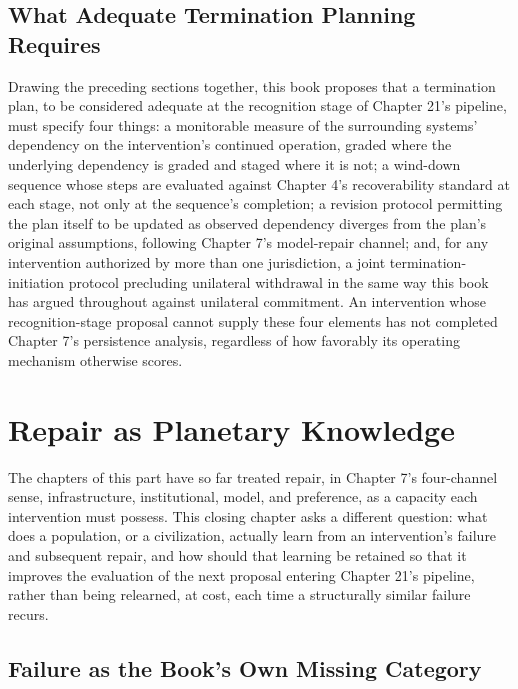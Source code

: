 \documentclass[11pt,oneside]{book}
\begin{document}
\section*{What Adequate Termination Planning Requires}

Drawing the preceding sections together, this book proposes that a termination plan, to be considered adequate at the recognition stage of Chapter 21's pipeline, must specify four things: a monitorable measure of the surrounding systems' dependency on the intervention's continued operation, graded where the underlying dependency is graded and staged where it is not; a wind-down sequence whose steps are evaluated against Chapter 4's recoverability standard at each stage, not only at the sequence's completion; a revision protocol permitting the plan itself to be updated as observed dependency diverges from the plan's original assumptions, following Chapter 7's model-repair channel; and, for any intervention authorized by more than one jurisdiction, a joint termination-initiation protocol precluding unilateral withdrawal in the same way this book has argued throughout against unilateral commitment. An intervention whose recognition-stage proposal cannot supply these four elements has not completed Chapter 7's persistence analysis, regardless of how favorably its operating mechanism otherwise scores.

\chapter{Repair as Planetary Knowledge}

The chapters of this part have so far treated repair, in Chapter 7's four-channel sense, infrastructure, institutional, model, and preference, as a capacity each intervention must possess. This closing chapter asks a different question: what does a population, or a civilization, actually learn from an intervention's failure and subsequent repair, and how should that learning be retained so that it improves the evaluation of the next proposal entering Chapter 21's pipeline, rather than being relearned, at cost, each time a structurally similar failure recurs.

\section*{Failure as the Book's Own Missing Category}
\end{document}
